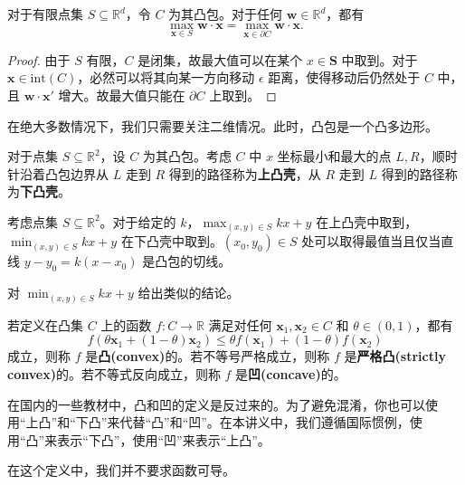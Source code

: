\begin{lemma}
    对于有限点集 $S\subseteq \mathbb R^d$，令 $C$ 为其凸包。对于任何 $\mathbf w\in \mathbb R^d$，都有
    $$
    \max_{\mathbf x\in S}\mathbf w\cdot \mathbf x=\max_{\mathbf x\in \partial C}\mathbf w\cdot \mathbf x.
    $$
\end{lemma}
\begin{proof}
    由于 $S$ 有限，$C$ 是闭集，故最大值可以在某个 $x\in \mathbf S$ 中取到。对于 $\mathbf x\in \mathrm{int}(C)$，必然可以将其向某一方向移动 $\epsilon$ 距离，使得移动后仍然处于 $C$ 中，且 $\mathbf w\cdot \mathbf x'$ 增大。故最大值只能在 $\partial C$ 上取到。
\end{proof}

在绝大多数情况下，我们只需要关注二维情况。此时，凸包是一个凸多边形。
\begin{definition}[上凸壳和下凸壳]
    对于点集 $S\subseteq \mathbb R^2$，设 $C$ 为其凸包。考虑 $C$ 中 $x$ 坐标最小和最大的点 $L,R$，顺时针沿着凸包边界从 $L$ 走到 $R$ 得到的路径称为\textbf{上凸壳}，从 $R$ 走到 $L$ 得到的路径称为\textbf{下凸壳}。
\end{definition}
\begin{corollary}
    考虑点集 $S\subseteq \mathbb R^2$。对于给定的 $k$，$\max_{(x,y)\in S}kx+y$ 在上凸壳中取到，$\min_{(x,y)\in S}kx+y$ 在下凸壳中取到。$(x_0,y_0)\in S$ 处可以取得最值当且仅当直线 $y-y_0=k(x-x_0)$ 是凸包的切线。
\end{corollary}
\begin{exercise}
    对 $\min_{(x,y)\in S}kx+y$ 给出类似的结论。
\end{exercise}

\begin{definition}[凸函数]
    若定义在凸集 $C$ 上的函数 $f:C\to \mathbb R$ 满足对任何 $\mathbf x_1,\mathbf x_2\in C$ 和 $\theta\in (0,1)$，都有
    $$
    f(\theta \mathbf x_1+(1-\theta)\mathbf x_2)\le \theta f(\mathbf x_1)+(1-\theta)f(\mathbf x_2)
    $$
    成立，则称 $f$ 是\textbf{凸(convex)}的。若不等号严格成立，则称 $f$ 是\textbf{严格凸(strictly convex)}的。若不等式反向成立，则称 $f$ 是\textbf{凹(concave)}的。
\end{definition}
\begin{remark}
    在国内的一些教材中，凸和凹的定义是反过来的。为了避免混淆，你也可以使用“上凸”和“下凸”来代替“凸”和“凹”。在本讲义中，我们遵循国际惯例，使用“凸”来表示“下凸”，使用“凹”来表示“上凸”。
\end{remark}
\begin{remark}
    在这个定义中，我们并不要求函数可导。
\end{remark}



